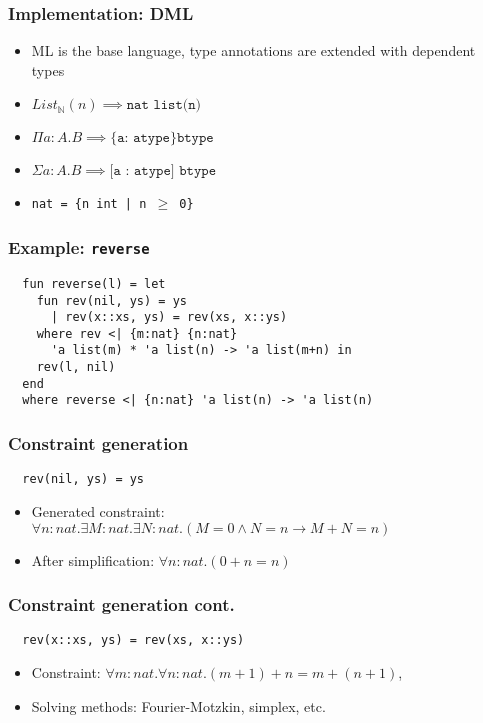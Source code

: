 \documentclass[pdf]{beamer}
\begin{document}
\begin{frame}
  \frametitle{Implementation: DML}

  \begin{itemize}
    \item ML is the base language, type annotations are extended with dependent
      types
    \item $\mathit{List_\mathbb{N}(n)} \implies \texttt{nat list(n)}$
    \item $\Pi a: A.B \implies \texttt{\{a: atype\} btype}$
    \item $\Sigma a: A.B \implies \texttt{[a : atype] btype}$
    \item \texttt{nat = \{n int | n $\geq$ 0\}}
  \end{itemize}
\end{frame}

\begin{frame}[fragile]
  \frametitle{Example: \texttt{reverse}}

  \begin{verbatim}
  fun reverse(l) = let
    fun rev(nil, ys) = ys
      | rev(x::xs, ys) = rev(xs, x::ys)
    where rev <| {m:nat} {n:nat}
      'a list(m) * 'a list(n) -> 'a list(m+n) in
    rev(l, nil)
  end
  where reverse <| {n:nat} 'a list(n) -> 'a list(n)
  \end{verbatim}
\end{frame}

\begin{frame}[fragile]
  \frametitle{Constraint generation}
  \begin{verbatim}
  rev(nil, ys) = ys
  \end{verbatim}

  \begin{itemize}
    \item Generated constraint: $\forall n : nat. \exists M : nat. \exists N :
      nat. (M = 0 \land N = n \to M + N = n)$

    \item After simplification: $\forall n : nat. (0 + n = n)$
  \end{itemize}
\end{frame}

\begin{frame}[fragile]
  \frametitle{Constraint generation cont.}

  \begin{verbatim}
  rev(x::xs, ys) = rev(xs, x::ys)
  \end{verbatim}

  \begin{itemize}
    \item Constraint:
      $\forall m : nat. \forall n : nat.(m + 1) + n = m + (n + 1)$,

    \item Solving methods: Fourier-Motzkin, simplex, etc.
  \end{itemize}
\end{frame}
\end{document}
